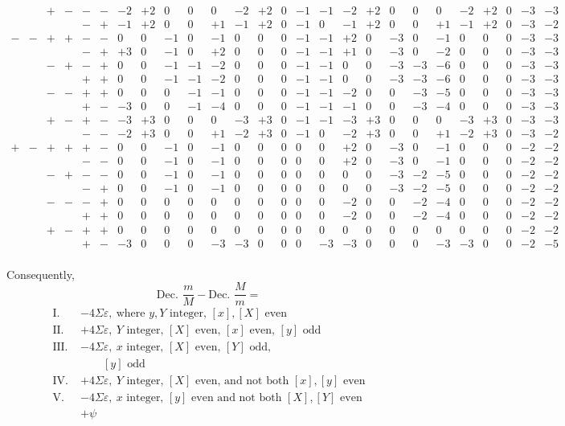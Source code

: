 \[\begin{array}{cccccc|rrrrr|rrrrr|rrrrr|rrrrr}
&&+&-&-&-&-2&+2&0&0&0&-2&+2&0&-1&-1&-2&+2&0&0&0&-2&+2&0&-3&-3\\
&&&&-&+&-1&+2&0&0&+1&-1&+2&0&-1&0&-1&+2&0&0&+1&-1&+2&0&-3&-2\\[4pt]
-&-&+&+&-&-&0&0&-1&0&-1&0&0&0&-1&-1&+2&0&-3&0&-1&0&0&0&-3&-3\\
&&&&-&+&+3&0&-1&0&+2&0&0&0&-1&-1&+1&0&-3&0&-2&0&0&0&-3&-3\\
&&-&+&-&+&0&0&-1&-1&-2&0&0&0&-1&-1&0&0&-3&-3&-6&0&0&0&-3&-3\\
&&&&+&+&0&0&-1&-1&-2&0&0&0&-1&-1&0&0&-3&-3&-6&0&0&0&-3&-3\\
&&-&-&+&+&0&0&0&-1&-1&0&0&0&-1&-1&-2&0&0&-3&-5&0&0&0&-3&-3\\
&&&&+&-&-3&0&0&-1&-4&0&0&0&-1&-1&-1&0&0&-3&-4&0&0&0&-3&-3\\
&&+&-&+&-&-3&+3&0&0&0&-3&+3&0&-1&-1&-3&+3&0&0&0&-3&+3&0&-3&-3\\
&&&&-&-&-2&+3&0&0&+1&-2&+3&0&-1&0&-2&+3&0&0&+1&-2&+3&0&-3&-2\\[4pt]
+&-&+&+&+&-&0&0&-1&0&-1&0&0&0&0&0&+2&0&-3&0&-1&0&0&0&-2&-2\\
&&&&-&-&0&0&-1&0&-1&0&0&0&0&0&+2&0&-3&0&-1&0&0&0&-2&-2\\
&&-&+&-&-&0&0&-1&0&-1&0&0&0&0&0&0&0&-3&-2&-5&0&0&0&-2&-2\\
&&&&-&+&0&0&-1&0&-1&0&0&0&0&0&0&0&-3&-2&-5&0&0&0&-2&-2\\
&&-&-&-&+&0&0&0&0&0&0&0&0&0&0&-2&0&0&-2&-4&0&0&0&-2&-2\\
&&&&+&+&0&0&0&0&0&0&0&0&0&0&-2&0&0&-2&-4&0&0&0&-2&-2\\
&&+&-&+&+&0&0&0&0&0&0&0&0&0&0&0&0&0&0&0&0&0&0&-2&-2\\
&&&&+&-&-3&0&0&0&-3&-3&0&0&0&-3&-3&0&0&0&-3&-3&0&0&-2&-5\\
\end{array}
\]
\endgroup

\clearpage
{}
Consequently,
\[
\text{Dec. }\frac mM-\text{Dec. }\frac Mm=
\]
\[
\begin{aligned}
\mathrm{I.}\;&-4\Sigma\varepsilon,\ \text{where }y,Y\text{ integer, }[x],[X]\text{ even}\\
\mathrm{II.}\;&+4\Sigma\varepsilon,\ Y\text{ integer, }[X]\text{ even, }[x]\text{ even, }[y]\text{ odd}\\
\mathrm{III.}\;&-4\Sigma\varepsilon,\ x\text{ integer, }[X]\text{ even, }[Y]\text{ odd,}\\
&\qquad [y]\text{ odd}\\
\mathrm{IV.}\;&+4\Sigma\varepsilon,\ Y\text{ integer, }[X]\text{ even, and not both }[x],[y]\text{ even}\\
\mathrm{V.}\;&-4\Sigma\varepsilon,\ x\text{ integer, }[y]\text{ even and not both }[X],[Y]\text{ even}\\
&+\psi
\end{aligned}
\]

